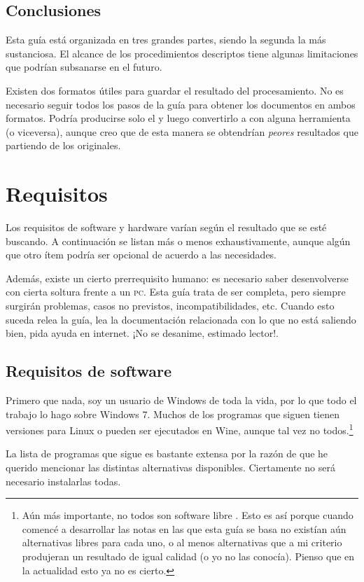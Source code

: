 \documentclass[%
	a5paper,
	10pt,
	twoside,
	openright,
	final,
]{memoir}
\begin{document}
{	\section{Conclusiones} Esta guía está organizada en tres grandes partes, siendo la segunda la más sustanciosa. El alcance de los procedimientos descriptos tiene algunas limitaciones que podrían subsanarse en el futuro. 

	Existen dos formatos útiles para guardar el resultado del procesamiento. No es necesario seguir todos los pasos de la guía para obtener los documentos en ambos formatos. Podría producirse solo el \djvu y luego convertirlo a \pdf con alguna herramienta (o viceversa), aunque creo que de esta manera se obtendrían \emph{peores} resultados que partiendo de los originales.

	\chapter{Requisitos} Los requisitos de software y hardware varían según el resultado que se esté buscando. A continuación se listan más o menos exhaustivamente, aunque algún que otro ítem podría ser opcional de acuerdo a las necesidades.

	Además, existe un cierto prerrequisito humano: es necesario saber desenvolverse con cierta soltura frente a un \textsc{pc}. Esta guía trata de ser completa, pero siempre surgirán problemas, casos no previstos, incompatibilidades, etc. Cuando esto suceda relea la guía, lea la documentación relacionada con lo que no está saliendo bien, pida ayuda en internet. ¡No se desanime, estimado lector!.

	\section{Requisitos de software\label{sec:softRequirements}} Primero que nada, soy un usuario de Windows de toda la vida, por lo que todo el trabajo lo hago sobre Windows 7. Muchos de los programas que siguen tienen versiones para Linux o pueden ser ejecutados en Wine, aunque tal vez no todos.\footnote{Aún más importante, no todos son software libre \cite{WikipediaFreeSoftware}. Esto es así porque cuando comencé a desarrollar las notas en las que esta guía se basa no existían aún alternativas libres para cada uno, o al menos alternativas que a mi criterio produjeran un resultado de igual calidad (o yo no las conocía). Pienso que en la actualidad esto ya no es cierto.}

	La lista de programas que sigue es bastante extensa por la razón de que he querido mencionar las distintas alternativas disponibles. Ciertamente no será necesario instalarlas todas.

}
\end{document}
